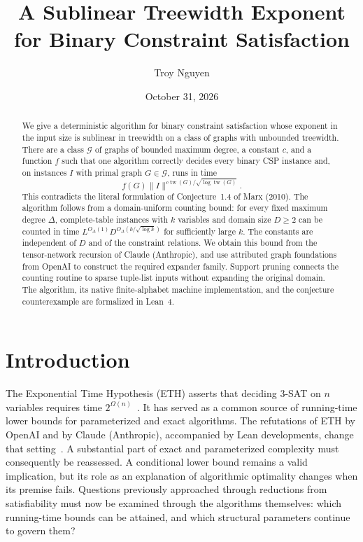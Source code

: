 \documentclass[11pt,reqno]{amsart}
\title[A sublinear treewidth exponent for binary CSP]{A Sublinear Treewidth Exponent\\for Binary Constraint Satisfaction}
\author{Troy Nguyen}
\date{October 31, 2026}
\numberwithin{equation}{section}
\theoremstyle{definition}
\theoremstyle{remark}
\newcommand{\tw}{\operatorname{tw}}
\begin{document}
\begin{abstract}
We give a deterministic algorithm for binary constraint satisfaction whose exponent in the input size is sublinear in treewidth on a class of graphs with unbounded treewidth. There are a class $\mathcal G$ of graphs of bounded maximum degree, a constant $c$, and a function $f$ such that one algorithm correctly decides every binary CSP instance and, on instances $I$ with primal graph $G\in\mathcal G$, runs in time
\[
 f(G)\lVert I\rVert^{c\tw(G)/\sqrt{\log\tw(G)}}.
\]
This contradicts the literal formulation of Conjecture~1.4 of Marx (2010). The algorithm follows from a domain-uniform counting bound: for every fixed maximum degree $\Delta$, complete-table instances with $k$ variables and domain size $D\ge2$ can be counted in time $L^{O_\Delta(1)}D^{O_\Delta(k/\sqrt{\log k})}$ for sufficiently large $k$. The constants are independent of $D$ and of the constraint relations. We obtain this bound from the tensor-network recursion of Claude (Anthropic), and use attributed graph foundations from OpenAI to construct the required expander family. Support pruning connects the counting routine to sparse tuple-list inputs without expanding the original domain. The algorithm, its native finite-alphabet machine implementation, and the conjecture counterexample are formalized in Lean~4.
\end{abstract}
\maketitle
\setcounter{tocdepth}{1}
\tableofcontents

\section{Introduction}

The Exponential Time Hypothesis (ETH) asserts that deciding $3$-SAT on $n$ variables requires time $2^{\Omega(n)}$~\cite{IP01}. It has served as a common source of running-time lower bounds for parameterized and exact algorithms. The refutations of ETH by OpenAI and by Claude (Anthropic), accompanied by Lean developments, change that setting~\cite{OpenAIETH,OpenAILean,ClaudeETH,AnthropicLean}. A substantial part of exact and parameterized complexity must consequently be reassessed. A conditional lower bound remains a valid implication, but its role as an explanation of algorithmic optimality changes when its premise fails. Questions previously approached through reductions from satisfiability must now be examined through the algorithms themselves: which running-time bounds can be attained, and which structural parameters continue to govern them?
\end{document}

